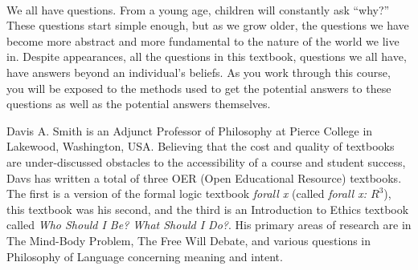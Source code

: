 \clearpage
\thispagestyle{empty}
\pagecolor{philgreen}\afterpage{\nopagecolor}

\vfill
\ 
\parbox{5 in}{\color{white}
We all have questions. From a young age, children will constantly ask ``why?'' These questions start simple enough, but as we grow older, the questions we have become more abstract and more fundamental to the nature of the world we live in. Despite appearances, all the questions in this textbook, questions we all have, have answers beyond an individual's beliefs. As you work through this course, you will be exposed to the methods used to get the potential answers to these questions as well as the potential answers themselves. 
}

\vfill

\parbox{5 in}{\color{white}
Davis A. Smith is an Adjunct Professor of Philosophy at Pierce College in Lakewood, Washington, USA. Believing that the cost and quality of textbooks are under-discussed obstacles to the accessibility of a course and student success, Davs has written a total of three OER (Open Educational Resource) textbooks. The first is a version of the formal logic textbook \emph{forall x} (called \emph{forall x: $R^3$}), this textbook was his second, and the third is an Introduction to Ethics textbook called \emph{Who Should I Be? What Should I Do?}.  His primary areas of research are in The Mind-Body Problem, The Free Will Debate, and various questions in Philosophy of Language concerning meaning and intent. 
}
